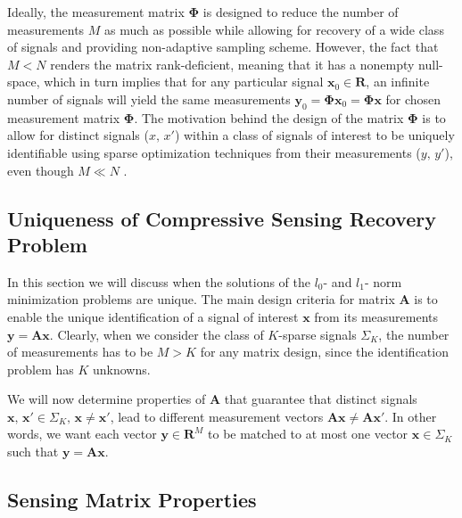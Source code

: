 \documentclass[journal]{IEEEtran}
\begin{document}
Ideally, the measurement matrix $\boldsymbol{\Phi}$ is designed to reduce the number of measurements $M$ as much as possible while allowing for recovery of a wide class of signals and providing non-adaptive sampling scheme. However, the fact that $M<N$ renders the matrix rank-deficient, meaning that it has a nonempty null-space, which in turn implies that for any particular signal $\boldsymbol{x}_0\in \mathbf{R}$, an infinite number of signals will yield the same measurements $\boldsymbol{y}_0=\boldsymbol{\Phi} \boldsymbol{x}_0 = \boldsymbol{\Phi} \boldsymbol{x}$ for chosen measurement matrix $\boldsymbol{\Phi}$. The motivation behind the design of the matrix $\boldsymbol{\Phi}$ is to allow for distinct signals ($x,\,x'$) within a class of signals of interest to be uniquely identifiable using sparse optimization techniques from their measurements ($y,\,y'$), even though $M\ll N$ \cite{Duarte2011}.

\subsection{Uniqueness of Compressive Sensing Recovery Problem}
In this section we will discuss when the solutions of the $l_0$- and $l_1$- norm minimization problems are unique. The main design criteria for matrix $\boldsymbol{A}$ is to enable the unique identification of a signal of interest $\boldsymbol{x}$ from its measurements $\boldsymbol{y}=\boldsymbol{A}\boldsymbol{x}$. Clearly, when we consider the class of $K$-sparse signals $\Sigma_K$, the number of measurements has to be $M>K$ for any matrix design, since the identification problem has $K$ unknowns.

We will now determine properties of $\boldsymbol{A}$ that guarantee that distinct signals $\boldsymbol{x},\,\boldsymbol{x'}\in \Sigma_K,\, \boldsymbol{x}\neq \boldsymbol{x'}$, lead to different measurement vectors $\boldsymbol{A}\boldsymbol{x}\neq \boldsymbol{A}\boldsymbol{x'}$. In other words, we want each vector $\boldsymbol{y}\in \mathbf{R}^M$ to be matched to at most one vector $\boldsymbol{x}\in \Sigma_K$ such that $\boldsymbol{y}=\boldsymbol{A}\boldsymbol{x}$.

\subsection{Sensing Matrix Properties}
\end{document}

